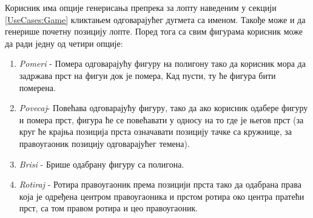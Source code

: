 Корисник има опције генерисања препрека за лопту наведеним у секцији \ref{UseCases:Game} кликтањем одговарајућег дугмета са именом. Такође може и да генерише почетну позицију лопте.  Поред тога са свим фигурама корисник може да ради једну од четири опције:
\begin{enumerate}
\item  \emph{Pomeri} - Помера одговарајућу фигуру на полигону тако да корисник мора да задржава прст на фигуи док је помера, Кад пусти, ту ће фигура бити померена. 
\item  \emph{Povecaj}- Повећава одговарајућу фигуру, тако да ако корисник одабере фигуру и помера прст, фигура ће се повећавати у односу на то где је његов прст (за круг ће крајња позиција прста означавати позицију тачке са кружнице, за правоугаоник позицију одговарајућег темена).
\item  \emph{Brisi} - Брише  одабрану фигуру са полигона.
\item  \emph{Rotiraj} - Ротира правоугаоник према позицији прста тако да одабрана права која је одређена центром правоугаоника и прстом ротира око центра пратећи прст, са том правом ротира и цео правоугаоник. 
\end{enumerate}

